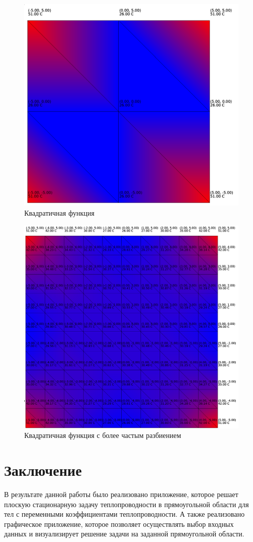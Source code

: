 \documentclass[a4paper, 14pt]{extarticle}
\begin{document}
\begin{figure}[h]
	\centering
	\includegraphics[width=0.7\linewidth]{images/test3}
	\caption[Рисунок]{Квадратичная функция}
\end{figure}

\begin{figure}[h]
	\centering
	\includegraphics[width=0.7\linewidth]{images/test4}
	\caption[Рисунок]{Квадратичная функция с более частым разбиением}
\end{figure}


\clearpage
\section{Заключение}

В результате данной работы было реализовано приложение, которое решает плоскую
стационарную задачу теплопроводности в прямоугольной области для тел с
переменными коэффициентами теплопроводности. А также реализовано графическое
приложение, которое позволяет осуществлять выбор входных данных  и визуализирует
решение задачи на заданной прямоугольной области.
\end{document}
